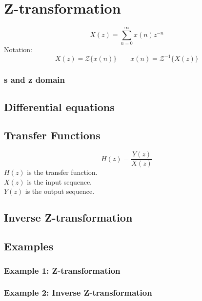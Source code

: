 \section{Z-transformation}
$$X(z)=\sum_{n=0}^{\infty}x(n)z^{-n}$$
Notation:
$$X(z)=\mathcal{Z}\{x(n)\}\qquad x(n)=\mathcal{Z}^{-1}\{X(z)\}$$
\subsubsection{s and z domain}

\subsection{Differential equations}
\subsection{Transfer Functions}
$$H(z)=\frac{Y(z)}{X(z)}$$
$H(z)$ is the transfer function.\\
$X(z)$ is the input sequence.\\
$Y(z)$ is the output sequence.

\subsection{Inverse Z-transformation}

\subsection{Examples}
\subsubsection{Example 1: Z-transformation}
\subsubsection{Example 2: Inverse Z-transformation}
